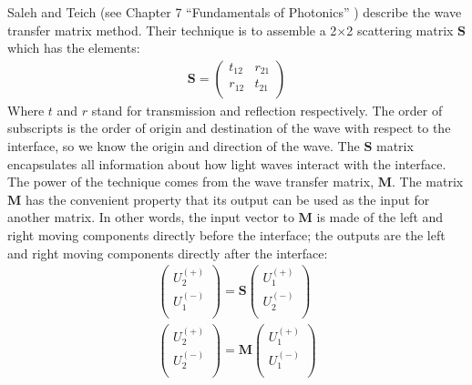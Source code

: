 \documentclass[osajnl,preprint,showpacs,superscriptaddress,12pt]{revtex4-1} %
\begin{document}
Saleh and Teich (see Chapter 7 ``Fundamentals of Photonics'' \cite{2007fuph.book.....S}) describe the wave transfer matrix method.  Their technique is to assemble a 2$\times$2 scattering matrix $\boldsymbol{S}$ which has the elements:
\begin{eqnarray}
\boldsymbol{S} = \left(
\begin{array}{cc}
 t_{12} & r_{21} \\
 r_{12} & t_{21} \\
\end{array}
\right)
\end{eqnarray}
Where $t$ and $r$ stand for transmission and reflection respectively.  The order of subscripts is the order of origin and destination of the wave with respect to the interface, so we know the origin and direction of the wave.  The $\boldsymbol{S}$ matrix encapsulates all information about how light waves interact with the interface.  The power of the technique comes from the wave transfer matrix, $\boldsymbol{M}$.  The matrix $\boldsymbol{M}$ has the convenient property that its output can be used as the input for another matrix.  In other words, the input vector to $\boldsymbol{M}$ is made of the left and right moving components directly before the interface; the outputs are the left and right moving components directly after the interface:
\begin{eqnarray}
\left(
\begin{array}{c}
 U_2^{(+)} \\
 U_1^{(-)} \\
\end{array}
\right)=\boldsymbol{S} \left(
\begin{array}{c}
 U_1^{(+)} \\
 U_2^{(-)} \\
\end{array}
\right) \\
\left(
\begin{array}{c}
 U_2^{(+)} \\
 U_2^{(-)} \\
\end{array}
\right)=\boldsymbol{M} \left(
\begin{array}{c}
 U_1^{(+)} \\
 U_1^{(-)} \\
\end{array}
\right)
\end{eqnarray}
\end{document}
